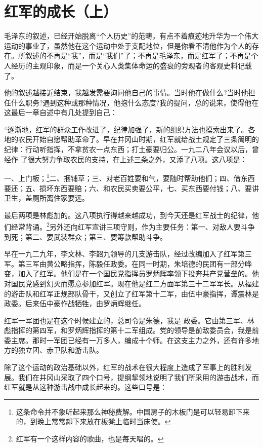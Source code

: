 \documentclass[10pt]{book}
\begin{document}
\section{红军的成长（上）}

毛泽东的叙述，已经开始脱离“个人历史”的范畴，有点不着痕迹地升华为一个伟大运动的事业了，虽然他在这个运动中处于支配地位，但是你看不清他作为个人的存在。所叙述的不再是“我”，而是“我们”了；不再是毛泽东，而是红军了；不再是个人经历的主观印象，而是一个关心人类集体命运的盛衰的旁观者的客观史料记载了。

他的叙述越接近结束，我越发需要询问他自己的事情。当时他在做什么?当时他担任什么职务?遇到这种或那种情况，他抱什么态度?我的提问，总的说来，使得他在这最后一章自述中有几处提到自己：

“逐渐地，红军的群众工作改进了，纪律加强了，新的组织方法也摸索出来了。各地的农民开始自愿帮助革命了。早在井冈山时期，红军就给战土规定了三条简明的纪律：行动听指挥，不拿贫农一点东西；打土豪要归公。一九二八年会议以后，曾经作 了很大努力争取农民的支持，在上述三条之外，又添了八项。这八项是：

一、上门板；\footnote{这条命令并不象听起来那么神秘费解。中国房子的木板门是可以轻易卸下来的，到晚上常常卸下来放在板凳上临时当床使。}二、捆铺草；三、对老百姓要和气，要随时帮助他们；四、借东西要还；五、损坏东西要赔；六、和农民买卖要公平，七、买东西要付钱；八、要讲卫生，盖厕所离住家要远。

最后两项是林彪加的。这八项执行得越来越成功，到今天还是红军战士的纪律，他们经常背诵。\footnote{红军有一个这样内容的歌曲，也是每天唱的。}另外还向红军宣讲三项守则，作为主要任务：第一、对敌人要斗争到死；第二、要武装群众；第三、要筹款帮助斗争。

早在一九二九年，李文林、李韶九领导的几支游击队，经过改编加入了红军第三军。第三军由黄公略指挥，陈毅任政委。在同一时期，朱培德的民团有一部分哗变，加入了红军。他们是在一个国民党指挥员罗炳辉率领下投奔共产党营垒的。他对国民党感到幻灭而愿意参加红军。现在他是红二方面军第三十二军军长。从福建的游击队和红军正规部队骨干，又创立了红军第十二军，由伍中豪指挥，谭震林是政委。后来伍中豪作战牺牲，由罗炳辉继任。

红军一军团也是在这个时候建立的，总司令是朱德，我是 政委。它由第三军、林彪指挥的第四军，和罗炳辉指挥的第十二军组成。党的领导是前敌委员会，我是前委主席。那时一军团已经有一万多人，编成十个师。在这支主力之外，还有许多地方的独立团、赤卫队和游击队。

除了这个运动的政治基础以外，红军的战术在很大程度上造成了军事上的胜利发展。我们在井冈山采取了四个口号，提纲挈领地说明了我们所采用的游击战术，而红军就是从这种游击战中成长起来的。这些口号是：
\end{document}
